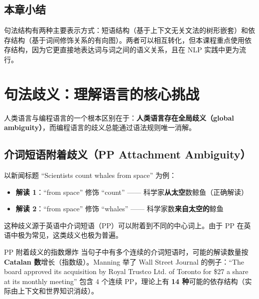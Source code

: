 \documentclass[a4paper]{article}
\begin{document}







\subsection{本章小结}

句法结构有两种主要表示方式：短语结构（基于上下文无关文法的树形嵌套）和依存结构（基于词间修饰关系的有向图）。两者可以相互转化，但本课程重点使用依存结构，因为它更直接地表达词与词之间的语义关系，且在 NLP 实践中更为流行。


\section{句法歧义：理解语言的核心挑战}

人类语言与编程语言的一个根本区别在于：\textbf{人类语言存在全局歧义（global ambiguity）}，而编程语言的歧义总能通过语法规则唯一消解。

\subsection{介词短语附着歧义（PP Attachment Ambiguity）}





以新闻标题 ``Scientists count whales from space'' 为例：

\begin{itemize}
    \item \textbf{解读 1}：``from space'' 修饰 ``count'' —— 科学家\textbf{从太空}数鲸鱼（正确解读）
    \item \textbf{解读 2}：``from space'' 修饰 ``whales'' —— 科学家数\textbf{来自太空的}鲸鱼
\end{itemize}

这种歧义源于英语中介词短语（PP）可以附着到不同的中心词上。由于 PP 在英语中极为常见，这类歧义也极为普遍。

\begin{warningbox}{PP 附着歧义的指数爆炸}
当句子中有多个连续的介词短语时，可能的解读数量按\textbf{Catalan 数}增长（指数级）。Manning 举了 Wall Street Journal 的例子：``The board approved its acquisition by Royal Trustco Ltd. of Toronto for \$27 a share at its monthly meeting'' 包含 4 个连续 PP，理论上有 \textbf{14 种}可能的依存结构（实际由上下文和世界知识消歧）。
\end{warningbox}
\end{document}
